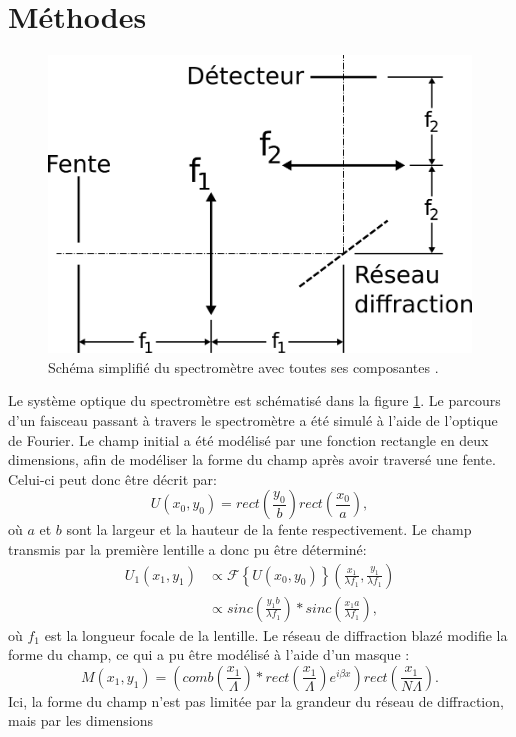 \documentclass[conference]{IEEEtran}
\begin{document}
\section{Méthodes \label{methodes}}
\begin{figure}[H]
    \centering
    \includegraphics[scale=0.4]{4f.png}
    \caption{Schéma simplifié du spectromètre avec toutes ses composantes \cite{procedurier}. \label{4f}}
\end{figure}
Le système optique du spectromètre est schématisé dans la figure \ref{4f}.
Le parcours d'un faisceau passant à travers le spectromètre a été simulé à l'aide 
de l'optique de Fourier. Le champ initial a été modélisé par une fonction rectangle en deux dimensions,
afin de modéliser la forme du champ après avoir traversé une fente. Celui-ci peut donc être décrit par:
\[U(x_0,y_0)=rect(\frac{y_0}{b})rect(\frac{x_0}{a}),\]
où $a$ et $b$ sont la largeur et la hauteur de la fente respectivement. Le champ transmis par 
la première lentille a donc pu être déterminé:
\begin{align*}
    U_1(x_1,y_1)&\propto\mathscr{F}\left\{U(x_0,y_0)\right\}(\frac{x_1}{\lambda f_1},\frac{y_1}{\lambda f_1})\\
    &\propto sinc(\frac{y_1b}{\lambda f_1})\ast sinc(\frac{x_1a}{\lambda f_1}),
\end{align*}
où $f_1$ est la longueur focale de la lentille. Le réseau de diffraction blazé modifie la forme du champ, ce qui a pu être
modélisé à l'aide d'un masque \cite{procedurier}:
\[M(x_1,y_1)=(comb(\frac{x_1}{\Lambda})\ast rect(\frac{x_1}{\Lambda})e^{i\beta x})rect(\frac{x_1}{N\Lambda}).\]
Ici, la forme du champ n'est pas limitée par la grandeur du réseau de diffraction, mais par les dimensions
\end{document}
